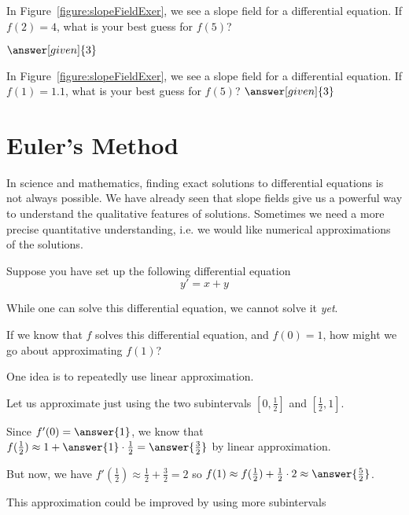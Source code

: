 \documentclass{ximera}
\begin{document}
In Figure~\ref{figure:slopeFieldExer}, we see a slope field for a
differential equation. If $f(2)=4$, what is your best guess for
$f(5)$?

$\answer[given]{3}$

In Figure~\ref{figure:slopeFieldExer}, we see a slope field for a
differential equation. If $f(1)=1.1$, what is your best guess for
$f(5)$?
$\answer[given]{3}$


{\def\length{sqrt(1+(-y^2+4*y-3)^2)}
}




















\section{Euler's Method}

In science and mathematics, finding exact solutions to differential equations is not always possible.
We have already seen that slope fields give us a powerful way to understand the qualitative features of solutions.
Sometimes we need a more precise quantitative understanding, i.e. we would like numerical approximations of the solutions.

\begin{example}
Suppose you have set up the following differential equation
\[
y' = x+y
\]

While one can solve this differential equation, we cannot solve it
\textit{yet}. 

If we know that $f$ solves this differential equation, and $f(0) = 1$, how might we go about approximating $f(1)$?

One idea is to repeatedly use linear approximation.

Let us approximate just using the two subintervals $[0,\frac{1}{2}]$ and $[\frac{1}{2},1]$.

Since $f'(0) = \answer{1}$, we know that $f(\frac{1}{2}) \approx 1+\answer{1} \cdot \frac{1}{2} = \answer{\frac{3}{2}}$ by linear approximation.

But now, we have $f'(\frac{1}{2}) \approx \frac{1}{2}+\frac{3}{2} = 2$ so $f(1) \approx  f(\frac{1}{2})+\frac{1}{2} \cdot 2 \approx \answer{\frac{5}{2}}$.

This approximation could be improved by using more subintervals
\end{example}
\end{document}
